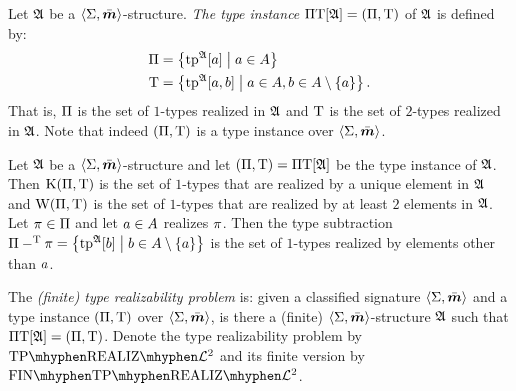 \begin{definition}
Let $\mathfrak{A}$ be a $\left\langle \mathrm{\Sigma},\bar{\bm{m}} \right\rangle$-structure.
\emph{The type instance} $\Pi\mathrm{T}[\mathfrak{A}] = (\Pi,\mathrm{T})$ of $\mathfrak{A}$ is defined by:
\begin{align*}
  \Pi &= \left\{\operatorname{tp}^{\mathfrak{A}}[a]\mathrel{}\middle|\mathrel{}a \in A\right\} \\
  \mathrm{T} &= \left\{\operatorname{tp}^{\mathfrak{A}}[a,b]\mathrel{}\middle|\mathrel{}a \in A, b \in A \setminus \left\{a\right\}\right\}.
\end{align*}
That is, $\Pi$ is the set of $1$-types realized in $\mathfrak{A}$ and $\mathrm{T}$ is the
set of $2$-types realized in $\mathfrak{A}$.
Note that indeed $(\Pi,\mathrm{T})$ is a type instance over $\left\langle \mathrm{\Sigma},\bar{\bm{m}} \right\rangle$.
\end{definition}
\begin{remark}\label{rem:tpi-char}
Let $\mathfrak{A}$ be a $\left\langle \mathrm{\Sigma},\bar{\bm{m}} \right\rangle$-structure and let $(\Pi,\mathrm{T}) =
\Pi\mathrm{T}[\mathfrak{A}]$ be the type instance of $\mathfrak{A}$.
Then $\mathrm{K}(\Pi,\mathrm{T})$ is the set of $1$-types that are realized by a unique
element in $\mathfrak{A}$ and $\mathrm{W}(\Pi,\mathrm{T})$ is the set of $1$-types that are
realized by at least $2$ elements in $\mathfrak{A}$.
Let $\pi \in \Pi$ and let $a \in A$ realizes $\pi$. Then the type
subtraction $\Pi -^{\mathrm{T}} \pi = \left\{\operatorname{tp}^{\mathfrak{A}}[b]\mathrel{}\middle|\mathrel{}b \in A \setminus \left\{a\right\}\right\}$ is the set of $1$-types
realized by elements other than $a$.
\end{remark}

\begin{definition}
The \emph{(finite) type realizability problem} is: given a classified signature
$\left\langle \mathrm{\Sigma},\bar{\bm{m}} \right\rangle$ and a type instance $(\Pi,\mathrm{T})$ over $\left\langle \mathrm{\Sigma},\bar{\bm{m}} \right\rangle$,
is there a (finite) $\left\langle \mathrm{\Sigma},\bar{\bm{m}} \right\rangle$-structure $\mathfrak{A}$ such that $\Pi\mathrm{T}[\mathfrak{A}] =
(\Pi,\mathrm{T})$.
Denote the type realizability problem by $\Real{\vFo2}$ and its finite version
by $\FinReal{\vFo2}$.
\end{definition}

